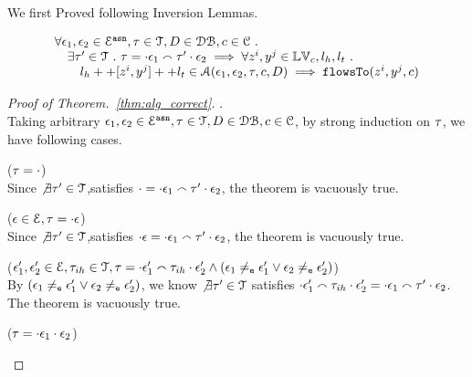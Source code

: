 We first Proved following Inversion Lemmas.

\clearpage
\begin{thm}[Correctness]
\label{thm:alg_correct}
\[
\begin{array}{l}
  \forall \mathtt{\epsilon}_1, \mathtt{\epsilon}_2 \in \mathcal{E}^{\mathtt{{asn}}}, \mathtt{\tau} \in \mathcal{T}, D \in \mathcal{DB} , c \in \mathcal{C} ~.~
  \\ \quad 
   \exists \mathtt{\tau}' \in \mathcal{T} ~.~ \mathtt{\tau} = \cdot \mathtt{\epsilon}_1 \smallfrown \mathtt{\tau}' \cdot \mathtt{\epsilon}_2
   \implies    \forall  z^i, y^j \in \mathbb{LV}_c, l_h, l_t ~.~ 
  \\ \qquad 
   l_h ++ [z^i, y^j] ++ l_t \in \mathcal{A}(\mathtt{\epsilon}_1, \mathtt{\epsilon}_2, \mathtt{\tau}, c, D)
   \implies \mathtt{flowsTo}(z^i, y^j, c)
\end{array}
\]
\end{thm}

\begin{proof}[Proof of Theorem.~\ref{thm:alg_correct}].
\\
Taking arbitrary $\mathtt{\epsilon}_1, \mathtt{\epsilon}_2 \in \mathcal{E}^{\mathtt{{asn}}}, \mathtt{\tau} \in \mathcal{T}, D \in \mathcal{DB} , c \in \mathcal{C}$,
by strong induction on $\mathtt{\tau}$, we have following cases.
\begin{case}($\mathtt{\tau} = \cdot$)
\\
Since $\not\exists \mathtt{\tau}' \in \mathcal{T}$,satisfies $
\cdot  = \cdot {} \mathtt{\epsilon}_1 \smallfrown \mathtt{\tau}' \cdot \mathtt{\epsilon}_2$, the theorem is vacuously true.
\end{case}
%
\begin{case}($\mathtt{\epsilon} \in \mathcal{E}, \mathtt{\tau} = \cdot \mathtt{\epsilon}$)
\\
Since $\not\exists \mathtt{\tau}' \in \mathcal{T}$,satisfies $
\cdot  \mathtt{\epsilon} = \cdot \mathtt{\epsilon}_1 \smallfrown \mathtt{\tau}' \cdot \mathtt{\epsilon}_2$, the theorem is vacuously true.
\end{case}
%
\begin{case}($\mathtt{\epsilon}_1', \mathtt{\epsilon}_2' \in \mathcal{E}, \mathtt{\tau}_{ih} \in \mathcal{T}, 
\mathtt{\tau} = \cdot \mathtt{\epsilon}_1' \smallfrown \mathtt{\tau}_{ih} \cdot \mathtt{\epsilon}_2' \land 
(\mathtt{\epsilon}_1 \neq_{\mathtt{e}} \mathtt{\epsilon}_1' \lor \mathtt{\epsilon}_2 \neq_{\mathtt{e}} \mathtt{\epsilon}_2')$)
\\
By $(\mathtt{\epsilon}_1 \neq_{\mathtt{e}} \mathtt{\epsilon}_1' \lor \mathtt{\epsilon}_2 \neq_{\mathtt{e}} \mathtt{\epsilon}_2')$,
we know $\not\exists \mathtt{\tau}' \in \mathcal{T}$ satisfies $
\cdot \mathtt{\epsilon}_1' \smallfrown \mathtt{\tau}_{ih} \cdot \mathtt{\epsilon}_2' = \cdot \mathtt{\epsilon}_1 \smallfrown \mathtt{\tau}' \cdot \mathtt{\epsilon}_2$.
\\
The theorem is vacuously true.
\end{case}
%
%
\begin{case}
\label{case:alg_correct_base}
($\mathtt{\tau} = \cdot {} \mathtt{\epsilon}_1 \cdot {} \mathtt{\epsilon}_2$)

\end{case}
\end{proof}
